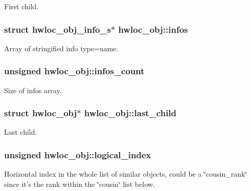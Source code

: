 First child. 

\hypertarget{a00016_ad59bcd73a10260a0e239be5c4b5888bb}{
\subsubsection[{infos}]{\setlength{\rightskip}{0pt plus 5cm}struct {\bf hwloc\_\-obj\_\-info\_\-s}$\ast$ {\bf hwloc\_\-obj::infos}}}
\label{a00016_ad59bcd73a10260a0e239be5c4b5888bb}


Array of stringified info type=name. 

\hypertarget{a00016_a9843acc28cfbba903b63ea14b137ff70}{
\subsubsection[{infos\_\-count}]{\setlength{\rightskip}{0pt plus 5cm}unsigned {\bf hwloc\_\-obj::infos\_\-count}}}
\label{a00016_a9843acc28cfbba903b63ea14b137ff70}


Size of infos array. 

\hypertarget{a00016_a84bd65634dbc55f4158b74443a9bd04f}{
\subsubsection[{last\_\-child}]{\setlength{\rightskip}{0pt plus 5cm}struct {\bf hwloc\_\-obj}$\ast$ {\bf hwloc\_\-obj::last\_\-child}}}
\label{a00016_a84bd65634dbc55f4158b74443a9bd04f}


Last child. 

\hypertarget{a00016_a0d07fb7b8935e137c94d75a3eb492ae9}{
\subsubsection[{logical\_\-index}]{\setlength{\rightskip}{0pt plus 5cm}unsigned {\bf hwloc\_\-obj::logical\_\-index}}}
\label{a00016_a0d07fb7b8935e137c94d75a3eb492ae9}


Horizontal index in the whole list of similar objects, could be a \char`\"{}cousin\_\-rank\char`\"{} since it's the rank within the \char`\"{}cousin\char`\"{} list below. 


